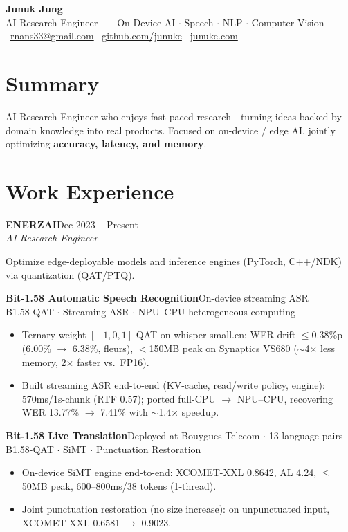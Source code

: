 \documentclass[a4paper,10pt]{article}
\newcommand{\entry}[3]{\textbf{#1}\hfill{\color{muted}#2}\\ \textit{#3}\par\vspace{1pt}}
\newcommand{\proj}[3]{\vspace{2pt}\textbf{#1}\hfill{\color{muted}\small #2}\\{\color{accent}\small #3}\par}
\begin{document}
\begin{center}
  {\Huge\bfseries Junuk Jung}\\[3pt]
  {\color{muted}\small AI Research Engineer \,---\, On-Device AI $\cdot$ Speech $\cdot$ NLP $\cdot$ Computer Vision}\\[4pt]
  {\small
  \faEnvelope[regular]~\href{mailto:rnans33@gmail.com}{rnans33@gmail.com} \quad
  \faGithub~\href{https://github.com/junuke}{github.com/junuke} \quad
  \faGlobe~\href{https://junuke.com}{junuke.com}}
\end{center}

\section{Summary}
AI Research Engineer who enjoys fast-paced research---turning ideas backed by domain knowledge into
real products. Focused on on-device / edge AI, jointly optimizing \textbf{accuracy, latency, and memory}.

\section{Work Experience}

\entry{ENERZAI}{Dec 2023 -- Present}{AI Research Engineer}
{\small Optimize edge-deployable models and inference engines (PyTorch, C++/NDK) via quantization (QAT/PTQ).}

\proj{Bit-1.58 Automatic Speech Recognition}{On-device streaming ASR}{B1.58-QAT $\cdot$ Streaming-ASR $\cdot$ NPU--CPU heterogeneous computing}
\begin{itemize}
  \item Ternary-weight $[-1,0,1]$ QAT on whisper-small.en: WER drift $\leq$0.38\%p (6.00\% $\to$ 6.38\%, fleurs),
  $<$150MB peak on Synaptics VS680 ($\sim$4$\times$ less memory, 2$\times$ faster vs.\ FP16).
  \item Built streaming ASR end-to-end (KV-cache, read/write policy, engine): 570ms/1s-chunk (RTF 0.57);
  ported full-CPU $\to$ NPU--CPU, recovering WER 13.77\% $\to$ 7.41\% with $\sim$1.4$\times$ speedup.
\end{itemize}

\proj{Bit-1.58 Live Translation}{Deployed at Bouygues Telecom $\cdot$ 13 language pairs}{B1.58-QAT $\cdot$ SiMT $\cdot$ Punctuation Restoration}
\begin{itemize}
  \item On-device SiMT engine end-to-end: XCOMET-XXL 0.8642, AL 4.24, $\leq$50MB peak, 600--800ms/38 tokens (1-thread).
  \item Joint punctuation restoration (no size increase): on unpunctuated input, XCOMET-XXL 0.6581 $\to$ 0.9023.
\end{itemize}
\end{document}
